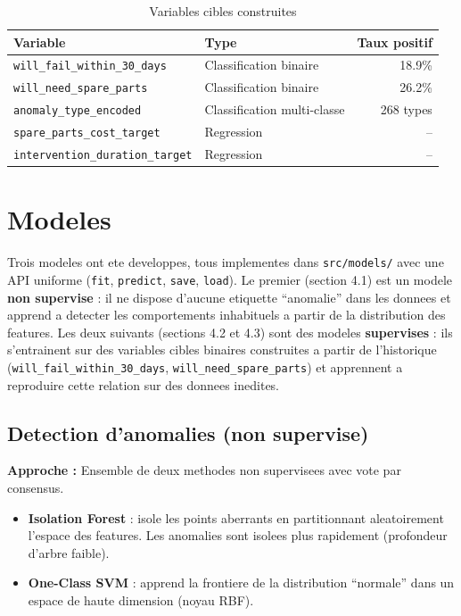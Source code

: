 \documentclass[12pt,a4paper]{article}
\begin{document}
\begin{table}[H]
\centering
\begin{tabular}{llr}
\toprule
\textbf{Variable} & \textbf{Type} & \textbf{Taux positif} \\
\midrule
\texttt{will\_fail\_within\_30\_days} & Classification binaire & 18.9\% \\
\texttt{will\_need\_spare\_parts} & Classification binaire & 26.2\% \\
\texttt{anomaly\_type\_encoded} & Classification multi-classe & 268 types \\
\texttt{spare\_parts\_cost\_target} & Regression & -- \\
\texttt{intervention\_duration\_target} & Regression & -- \\
\bottomrule
\end{tabular}
\caption{Variables cibles construites}
\end{table}

\section{Modeles}

Trois modeles ont ete developpes, tous implementes dans \texttt{src/models/} avec une API uniforme (\texttt{fit}, \texttt{predict}, \texttt{save}, \texttt{load}). Le premier (section 4.1) est un modele \textbf{non supervise} : il ne dispose d'aucune etiquette ``anomalie'' dans les donnees et apprend a detecter les comportements inhabituels a partir de la distribution des features. Les deux suivants (sections 4.2 et 4.3) sont des modeles \textbf{supervises} : ils s'entrainent sur des variables cibles binaires construites a partir de l'historique (\texttt{will\_fail\_within\_30\_days}, \texttt{will\_need\_spare\_parts}) et apprennent a reproduire cette relation sur des donnees inedites.

\subsection{Detection d'anomalies (non supervise)}

\textbf{Approche :} Ensemble de deux methodes non supervisees avec vote par consensus.

\begin{itemize}
  \item \textbf{Isolation Forest} : isole les points aberrants en partitionnant aleatoirement l'espace des features. Les anomalies sont isolees plus rapidement (profondeur d'arbre faible).
  \item \textbf{One-Class SVM} : apprend la frontiere de la distribution ``normale'' dans un espace de haute dimension (noyau RBF).
\end{itemize}
\end{document}
